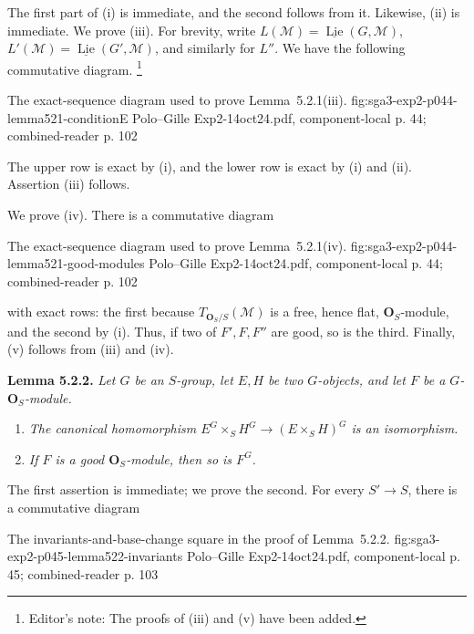 The first part of (i) is immediate, and the second follows from it.
Likewise, (ii) is immediate. We prove (iii). For brevity, write
\(L(\mathscr M)=\underline{\operatorname{Lie}}(G,\mathscr M)\),
\(L'(\mathscr M)=\underline{\operatorname{Lie}}(G',\mathscr M)\),
and similarly for \(L''\). We have the following commutative diagram.
\footnote{Editor's note: The proofs of (iii) and (v) have been added.}

  {The exact-sequence diagram used to prove Lemma~5.2.1(iii).}
  {fig:sga3-exp2-p044-lemma521-conditionE}
  {Polo--Gille Exp2-14oct24.pdf, component-local p. 44;
   combined-reader p. 102}

The upper row is exact by (i), and the lower row is exact by (i) and
(ii). Assertion (iii) follows.

We prove (iv). There is a commutative diagram

  {The exact-sequence diagram used to prove Lemma~5.2.1(iv).}
  {fig:sga3-exp2-p044-lemma521-good-modules}
  {Polo--Gille Exp2-14oct24.pdf, component-local p. 44;
   combined-reader p. 102}

with exact rows: the first because
\(T_{\mathbf O_S/S}(\mathscr M)\) is a free, hence flat,
\(\mathbf O_S\)-module, and the second by (i). Thus, if two of
\(F',F,F''\) are good, so is the third. Finally, (v) follows from
(iii) and (iv).

\medskip
\noindent\textbf{Lemma 5.2.2.}
\textit{Let \(G\) be an \(S\)-group, let \(E,H\) be two \(G\)-objects,
and let \(F\) be a \(G\)-\(\mathbf O_S\)-module.}
\begin{enumerate}
\renewcommand{\labelenumi}{(\roman{enumi})}
\item \textit{The canonical homomorphism
\(E^G\times_S H^G\to(E\times_S H)^G\) is an isomorphism.}
\item \textit{If \(F\) is a good \(\mathbf O_S\)-module, then so is
\(F^G\).}
\end{enumerate}

The first assertion is immediate; we prove the second. For every
\(S'\to S\), there is a commutative diagram

  {The invariants-and-base-change square in the proof of Lemma~5.2.2.}
  {fig:sga3-exp2-p045-lemma522-invariants}
  {Polo--Gille Exp2-14oct24.pdf, component-local p. 45;
   combined-reader p. 103}

